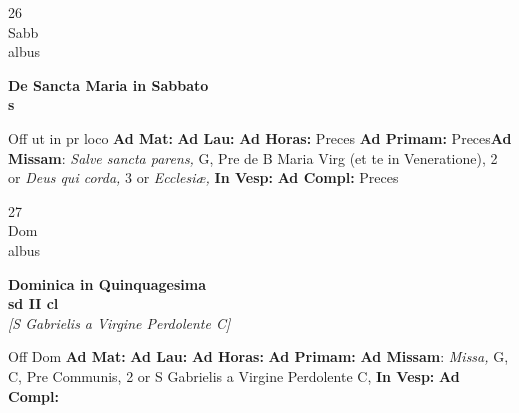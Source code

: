 \documentclass[10pt, openany]{book}
\begin{document}
    \begin{center}
        \begin{minipage}{3.5in}
            \vspace{2em}
            \begin{minipage}{0.5in}
                {\Huge 26} \\
                {\normalsize Sabb} \\
                {\normalsize albus}
            \end{minipage}
            \begin{minipage}{3.0in}
                \textbf{ \large De Sancta Maria in Sabbato \\
                \textnormal{\normalsize s}} \\ 
            \end{minipage}
            \begin{justify}Off ut in pr loco
                \textbf{Ad Mat: }
                \textbf{Ad Lau: }
                \textbf{Ad Horas: }Preces
                \textbf{Ad Primam: }Preces\textbf{Ad Missam}: \textit{Salve sancta parens,} G, Pre de B Maria Virg (et te in Veneratione), 2 or \textit{Deus qui corda,} 3 or \textit{Ecclesiæ,}  
                \textbf{In Vesp: }
                \textbf{Ad Compl: }Preces
            \end{justify}
        \end{minipage}
    \end{center}

    \begin{center}
        \begin{minipage}{3.5in}
            \vspace{2em}
            \begin{minipage}{0.5in}
                {\Huge 27} \\
                {\normalsize Dom} \\
                {\normalsize albus}
            \end{minipage}
            \begin{minipage}{3.0in}
                \textbf{ \large Dominica in Quinquagesima \\
                \textnormal{\normalsize sd II cl}} \\ \textit{[S Gabrielis a Virgine Perdolente C]} \\ 
            \end{minipage}
            \begin{justify}Off Dom
                \textbf{Ad Mat: }
                \textbf{Ad Lau: }
                \textbf{Ad Horas: }
                \textbf{Ad Primam: }\textbf{Ad Missam}: \textit{Missa,} G, C, Pre Communis, 2 or S Gabrielis a Virgine Perdolente C,  
                \textbf{In Vesp: }
                \textbf{Ad Compl: }
            \end{justify}
        \end{minipage}
    \end{center}
\end{document}
